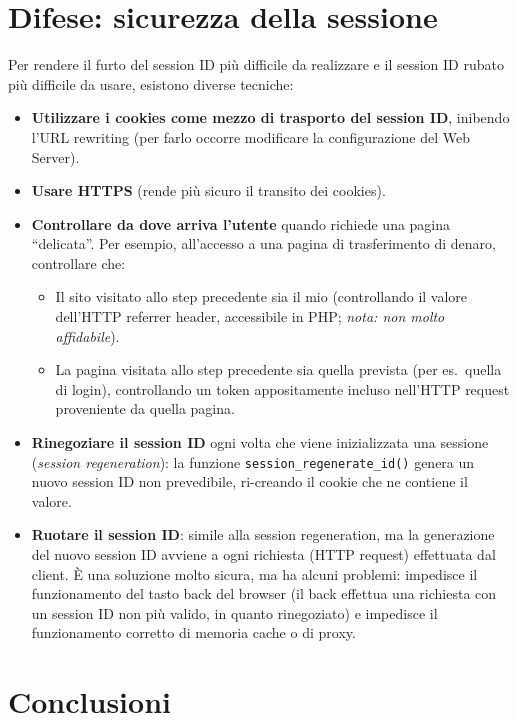\section{Difese: sicurezza della sessione}

Per rendere il furto del session ID più difficile da realizzare e il session ID rubato più difficile da usare, esistono diverse tecniche:

\begin{itemize}
    \item \textbf{Utilizzare i cookies come mezzo di trasporto del session ID}, inibendo l'URL rewriting (per farlo occorre modificare la configurazione del Web Server).
    \item \textbf{Usare HTTPS} (rende più sicuro il transito dei cookies).
    \item \textbf{Controllare da dove arriva l'utente} quando richiede una pagina ``delicata''. Per esempio, all'accesso a una pagina di trasferimento di denaro, controllare che:
    \begin{itemize}
        \item Il sito visitato allo step precedente sia il mio (controllando il valore dell'HTTP referrer header, accessibile in PHP; \emph{nota: non molto affidabile}).
        \item La pagina visitata allo step precedente sia quella prevista (per es.\ quella di login), controllando un token appositamente incluso nell'HTTP request proveniente da quella pagina.
    \end{itemize}
    \item \textbf{Rinegoziare il session ID} ogni volta che viene inizializzata una sessione (\emph{session regeneration}): la funzione \texttt{session\_regenerate\_id()} genera un nuovo session ID non prevedibile, ri-creando il cookie che ne contiene il valore.
    \item \textbf{Ruotare il session ID}: simile alla session regeneration, ma la generazione del nuovo session ID avviene a ogni richiesta (HTTP request) effettuata dal client. È una soluzione molto sicura, ma ha alcuni problemi: impedisce il funzionamento del tasto back del browser (il back effettua una richiesta con un session ID non più valido, in quanto rinegoziato) e impedisce il funzionamento corretto di memoria cache o di proxy.
\end{itemize}

\section{Conclusioni}

